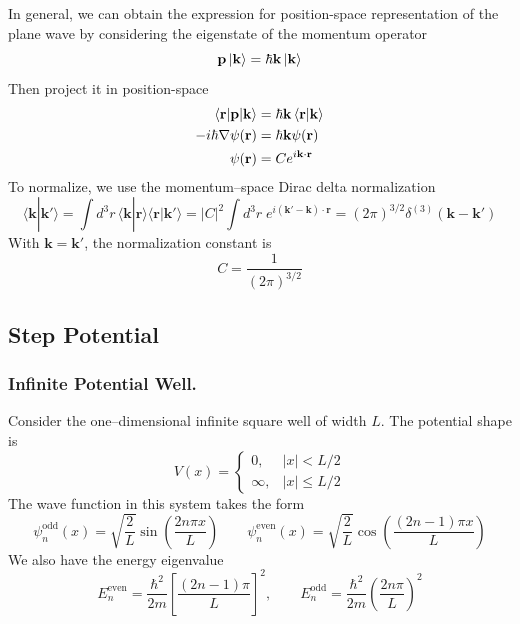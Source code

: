 \documentclass[../../../main.tex]{subfiles}
\begin{document}
In general, we can obtain the expression for position-space representation of the plane wave by considering the eigenstate of the momentum operator
\begin{equation*}
  \mathbf{p }\ket{\mathbf{k }}  = \hbar \mathbf{k }\ket{\mathbf{k}}
\end{equation*} 
Then project it in position-space
\begin{align*}
    \braket{\mathbf{r }|\mathbf{p } | \mathbf{k }} 
  & =  \hbar \mathbf{k} \braket{\mathbf{r } | \mathbf{k}}\\
  -i \hbar \nabla \psi(\mathbf{r }) 
  & =  \hbar \mathbf{k }\psi(\mathbf{r })\\
  \psi(\mathbf{r})
  & = C e ^{i \mathbf{k }\cdot \mathbf{r}}
\end{align*}
To normalize, we use the momentum–space Dirac delta normalization
\begin{equation*}
    \langle \mathbf{k}|\mathbf{k}'\rangle = \int d^3r\,\langle \mathbf{k}|\mathbf{r}\rangle\langle \mathbf{r}|\mathbf{k}'\rangle
= |C|^2\int d^3r \; e^{i(\mathbf{k}'-\mathbf{k})\cdot\mathbf{r}}=
(2\pi)^{3/2}\delta^{(3)}({\mathbf{k }-\mathbf{k}'})
\end{equation*}
With $\mathbf{k }=\mathbf{k}'$, the normalization constant is 
\begin{equation*}
  C = \frac{1 }{(2\pi) ^{3/2}}
\end{equation*}

\subsection{Step Potential}
\subsubsection{Infinite Potential Well.}
Consider the one--dimensional infinite square well of width \(L\).
The potential shape is
\begin{equation*}
  V(x)=
  \begin{cases}
    0,      & |x|<L/2      \\
    \infty, & |x| \leq L/2
  \end{cases}
\end{equation*}
The wave function in this system takes the form
\begin{equation*}
  \psi_n^{\text{odd}}(x) = \sqrt{\frac{2  }{L }} \sin\left(\frac{2 n \pi x}{L}\right)
  \qquad
  \psi_n^{\text{even}}(x) =\sqrt{\frac{2 }{L }} \cos\left(\frac{(2n-1)\pi x}{L}\right)
\end{equation*}
We also have the energy eigenvalue
\begin{equation*}
  E_n^{\text{even}} = \frac{\hbar^2}{2 m} \left[\frac{(2n-1)\pi}{L}\right]^2, \qquad
  E_n^{\text{odd}} = \frac{\hbar^2}{2 m} \left(\frac{2 n \pi}{L}\right)^2
\end{equation*}
\end{document}
